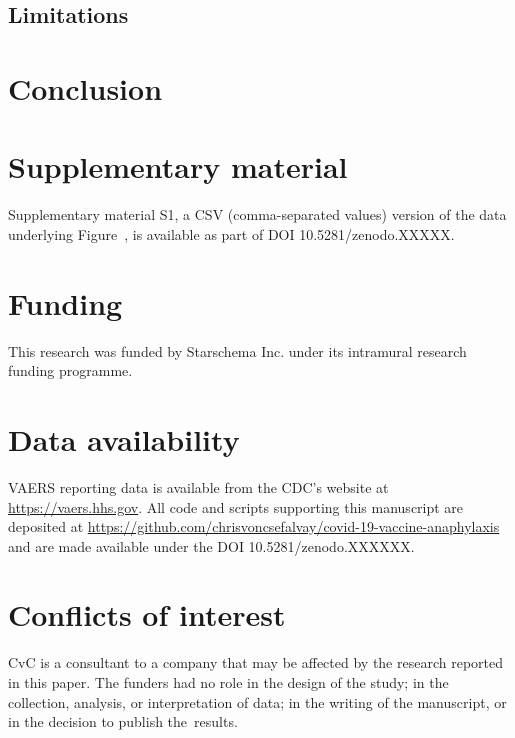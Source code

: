 \documentclass{article}
\begin{document}
\subsection{Limitations}

\section{Conclusion}

\vspace{6pt}

\section*{Supplementary material}

Supplementary material S1, a CSV (comma-separated values) version of the data underlying Figure~, is available as part of DOI 10.5281/zenodo.XXXXX.

\section*{Funding}

This research was funded by Starschema Inc. under its intramural research funding programme.

\section*{Data availability}

VAERS reporting data is available from the CDC's website at \url{https://vaers.hhs.gov}.
All code and scripts supporting this manuscript are deposited at
\url{https://github.com/chrisvoncsefalvay/covid-19-vaccine-anaphylaxis} and are made available under the DOI 10.5281/zenodo.XXXXXX.

\section*{Conflicts of interest}

CvC is a consultant to a company that may be affected by the research reported in this paper.
The funders had no role in the design of the study;
in the collection, analysis, or interpretation of data;
in the writing of the manuscript, or in the decision to publish the~results.


\end{document}
